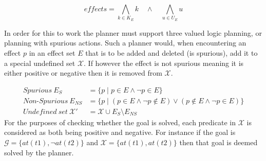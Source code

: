 \documentclass[../Master.tex]{subfiles}
\begin{document}
	\begin{equation}
		effects = \bigwedge\limits_{k \in K_E} k \quad \land \quad \bigwedge\limits_{u \in U_E} u
	\end{equation}

	In order for this to work the planner must support three valued logic planning, or planning with spurious actions.
	Such a planner would, when encountering an effect $p$ in an effect set $E$ that is to be added and deleted (is spurious), add it to a special undefined set $\mathcal{X}$.
	If however the effect is not spurious meaning it is either positive or negative then it is removed from $\mathcal{X}$.

			\begin{equation}
				\begin{split}
					Spurious~E_S &= \{ p \mid p \in E \land \neg p \in E \} \\
					Non\text{-}Spurious~E_{NS} &= \{ p \mid (p \in E \land \neg p \notin E ) \lor (p \notin E \land \neg p \in E )  \}\\
					Undefined ~ set ~ \mathcal{X}' &= \mathcal{X} \cup E_S \setminus E_{NS}
				\end{split}
			\end{equation}
	For the purposes of checking whether the goal is solved, each predicate in $\mathcal{X}$ is considered as both being positive and negative.
	For instance if the goal is $\mathcal{G} = \{at(t1), \neg at(t2)\}$ and $\mathcal{X} = \{at(t1), at(t2)\}$ then that goal is deemed solved by the planner.
\end{document}
